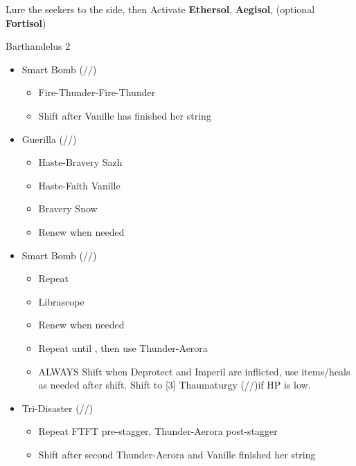 Lure the seekers to the side, then 
Activate \textbf{Ethersol}, \textbf{Aegisol}, (optional \textbf{Fortisol})
\renewcommand{\first}{[1] Guerilla (\syn/\rav/\sab)}
\renewcommand{\second}{[2] Tri-Disaster (\rav/\rav/\rav)}
\renewcommand{\third}{[3] Thaumaturgy (\rav/\rav/\med)}
\renewcommand{\fourth}{[4] Tireless Charge (\com/\com/\med)}
\renewcommand{\fifth}{[5] Smart Bomb (\rav/\rav/\sab)}
\renewcommand{\sixth}{[6] Aggression (\com/\com/\rav)}
\begin{battle}{Barthandelus 2}
\begin{multicols}{2}
\begin{itemize}
    \item \fifth
    \begin{itemize}
        \item Fire-Thunder-Fire-Thunder
        \item Shift after Vanille has finished her string
    \end{itemize}
    \item \first
    \begin{itemize}
        \item Haste-Bravery Sazh
        \item Haste-Faith Vanille
        \item Bravery Snow
        \item Renew when needed
    \end{itemize}
    \item \fifth
    \begin{itemize}
        \item Repeat
        \item Librascope
        \item Renew when needed
        \item Repeat until \stagger, then use Thunder-Aerora
        \item ALWAYS Shift when Deprotect and Imperil are inflicted, use items/heals as needed after shift. Shift to \third if HP is low.
    \end{itemize}
    \item \second
    \begin{itemize}
        \item Repeat FTFT pre-stagger, Thunder-Aerora post-stagger
        \item Shift after second Thunder-Aerora and Vanille finished her string
    \end{itemize}

\end{itemize}
\end{multicols}
\end{battle}

